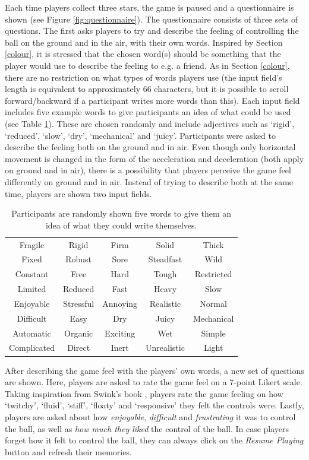 Each time players collect three stars, the game is paused and a questionnaire is shown (see Figure \ref{fig:questionnaire}). The questionnaire consists of three sets of questions. The first asks players to try and describe the feeling of controlling the ball on the ground and in the air, with their own words. Inspired by Section \ref{colour}, it is stressed that the chosen word(s) should be something that the player would use to describe the feeling to e.g. a friend. As in Section \ref{colour}, there are no restriction on what types of words players use (the input field's length is equivalent to approximately 66 characters, but it is possible to scroll forward/backward if a participant writes more words than this). Each input field includes five example words to give participants an idea of what could be used (see Table \ref{table:wordsExamples}). These are chosen randomly and include adjectives such as `rigid', `reduced', `slow', `dry', `mechanical' and `juicy'. Participants were asked to describe the feeling both on the ground and in air. Even though only horizontal movement is changed in the form of the acceleration and deceleration (both apply on ground and in air), there is a possibility that players perceive the game feel differently on ground and in air. Instead of trying to describe both at the same time, players are shown two input fields.

\begin{table} \centering
\scriptsize
\caption{Participants are randomly shown five words to give them an idea of what they could write themselves.}
\label{table:wordsExamples}
\begin{tabular}{ccccc}
\toprule
Fragile & Rigid & Firm & Solid & Thick\\
Fixed & Robust & Sore & Steadfast & Wild\\
Constant & Free & Hard & Tough & Restricted\\
Limited & Reduced & Fast & Heavy & Slow\\
Enjoyable & Stressful & Annoying & Realistic & Normal\\
Difficult & Easy & Dry & Juicy & Mechanical\\
Automatic & Organic & Exciting & Wet & Simple\\
Complicated & Direct & Inert & Unrealistic & Light\\
\bottomrule
\end{tabular}
\end{table}

After describing the game feel with the players' own words, a new set of questions are shown. Here, players are asked to rate the game feel on a 7-point Likert scale. Taking inspiration from Swink's book \cite{swink}, players rate the game feeling on how `twitchy', `fluid', `stiff', `floaty' and `responsive' they felt the controls were. Lastly, players are asked about how \textit{enjoyable}, \textit{difficult} and \textit{frustrating} it was to control the ball, as well as \textit{how much they liked} the control of the ball. In case players forget how it felt to control the ball, they can always click on the \textit{Resume Playing} button and refresh their memories.

